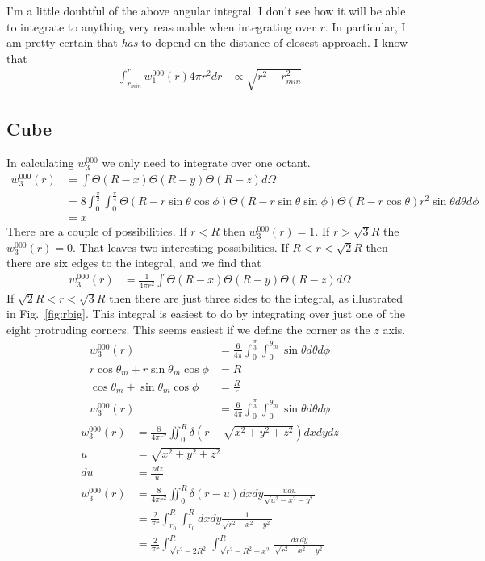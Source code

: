 \documentclass[letterpaper,twocolumn,amsmath,amssymb,pre]{revtex4-1}
\begin{document}
I'm a little doubtful of the above angular integral.  I don't see how
it will be able to integrate to anything very reasonable when
integrating over $r$.  In particular, I am pretty certain that
\emph{has} to depend on the distance of closest approach.
I know that
\begin{align}
  \int_{r_{min}}^{r} w_1^{000}(r)4\pi r^2dr
  &\propto \sqrt{r^2 - r_{min}^2}
\end{align}

\subsection{Cube}

In calculating $w_3^{000}$ we only need to integrate over one octant.
\begin{align}
  w_3^{000}(r) &= \int \Theta(R-x)\Theta(R-y)\Theta(R-z) d\Omega
  \\
  &= 8\int_0^{\frac{\pi}{2}} \int_0^{\frac{\pi}{4}}
  \Theta(R-r\sin\theta\cos\phi)
  \Theta(R-r\sin\theta\sin\phi)
  \Theta(R-r\cos\theta)
  r^2\sin\theta d\theta d\phi
  \\
  &=
  x
\end{align}
There are a couple of possibilities.  If $r<R$ then $w_3^{000}(r) =
1$.  If $r>\sqrt{3}R$ the $w_3^{000}(r) = 0$.  That leaves two
interesting possibilities.  If $R<r<\sqrt{2}R$ then there are six
edges to the integral, and we find that
\begin{align}
  w_3^{000}(r) &= \frac1{4\pi r^2}\int \Theta(R-x)\Theta(R-y)\Theta(R-z) d\Omega
\end{align}
If $\sqrt{2}R<r<\sqrt{3}R$ then there are just three sides to the
integral, as illustrated in Fig.~\ref{fig:rbig}.  This integral is
easiest to do by integrating over just one of the eight protruding
corners.  This seems easiest if we define the corner as the $z$ axis.
\begin{align}
  w_3^{000}(r) &= \frac{6}{4\pi}
  \int_{0}^{\frac{\pi}{3}}
  \int_0^{\theta_{m}} \sin\theta d\theta d\phi \\
  r\cos\theta_{m} + r\sin\theta_{m}\cos\phi  &= R
  \\
  \cos\theta_{m} + \sin\theta_{m}\cos\phi  &= \frac{R}{r} \\
  w_3^{000}(r) &= \frac{6}{4\pi}
  \int_{0}^{\frac{\pi}{3}}
  \int_0^{\theta_{m}} \sin\theta d\theta d\phi
\end{align}
\begin{align}
  w_3^{000}(r) &= \frac{8}{4\pi r^2}\iint_0^R \delta(r-\sqrt{x^2+y^2+z^2})
  dxdydz \\
  u &= \sqrt{x^2+y^2+z^2} \\
  du &= \frac{zdz}{u} \\
  w_3^{000}(r) &= \frac{8}{4\pi r^2}\iint_0^R \delta(r-u)
  dxdy\frac{udu}{\sqrt{u^2 -x^2-y^2}} \\
  &= \frac{2}{\pi r}\int_{r_0}^R\int_{r_0}^R
  dxdy\frac{1}{\sqrt{r^2 -x^2-y^2}} \\
  &= \frac{2}{\pi r}\int_{\sqrt{r^2-2R^2}}^R\int_{\sqrt{r^2-R^2-x^2}}^R
  \frac{dxdy}{\sqrt{r^2 -x^2-y^2}} \\
\end{align}
\end{document}
